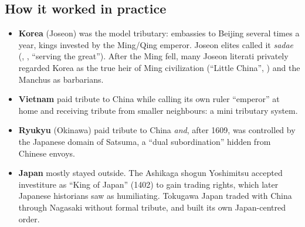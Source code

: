 \begin{center}
\end{center}

\subsection{How it worked in practice}

\begin{itemize}
  \item \textbf{Korea} (Joseon) was the model tributary: embassies to Beijing several times a
        year, kings invested by the Ming/Qing emperor. Joseon elites called it
        \emph{sadae} (, , ``serving the great''). After the Ming fell,
        many Joseon literati privately regarded Korea as the true heir of Ming civilization
        (``Little China'', ) and the Manchus as barbarians.
  \item \textbf{Vietnam} paid tribute to China while calling its own ruler ``emperor''
        at home and receiving tribute from smaller neighbours: a mini tributary system.
  \item \textbf{Ryukyu} (Okinawa) paid tribute to China \emph{and}, after 1609, was
        controlled by the Japanese domain of Satsuma, a ``dual subordination'' hidden from
        Chinese envoys.
  \item \textbf{Japan} mostly stayed outside. The Ashikaga shogun Yoshimitsu accepted
        investiture as ``King of Japan'' (1402) to gain trading rights, which later
        Japanese historians saw as humiliating. Tokugawa Japan traded with China through
        Nagasaki without formal tribute, and built its own Japan-centred order.
\end{itemize}

